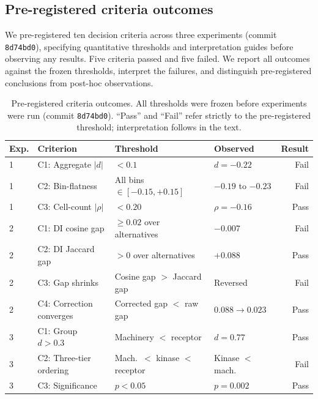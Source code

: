 
\subsection{Pre-registered criteria outcomes}

We pre-registered ten decision criteria across three experiments (commit \texttt{8d74bd0}), specifying quantitative thresholds and interpretation guides before observing any results.
Five criteria passed and five failed.
We report all outcomes against the frozen thresholds, interpret the failures, and distinguish pre-registered conclusions from post-hoc observations.

\begin{table}[htbp]
\centering
\caption{Pre-registered criteria outcomes. All thresholds were frozen before experiments were run (commit \texttt{8d74bd0}). ``Pass'' and ``Fail'' refer strictly to the pre-registered threshold; interpretation follows in the text.}
\label{tab:prereg_outcomes}
\small
\begin{tabular}{llllr}
\toprule
\textbf{Exp.} & \textbf{Criterion} & \textbf{Threshold} & \textbf{Observed} & \textbf{Result} \\
\midrule
1 & C1: Aggregate $|d|$ & $< 0.1$ & $d = -0.22$ & Fail \\
1 & C2: Bin-flatness & All bins $\in [-0.15, +0.15]$ & $-0.19$ to $-0.23$ & Fail \\
1 & C3: Cell-count $|\rho|$ & $< 0.20$ & $\rho = -0.16$ & Pass \\
\midrule
2 & C1: DI cosine gap & $\geq 0.02$ over alternatives & $-0.007$ & Fail \\
2 & C2: DI Jaccard gap & $> 0$ over alternatives & $+0.088$ & Pass \\
2 & C3: Gap shrinks & Cosine gap $>$ Jaccard gap & Reversed & Fail \\
2 & C4: Correction converges & Corrected gap $<$ raw gap & $0.088 \to 0.023$ & Pass \\
\midrule
3 & C1: Group $d > 0.3$ & Machinery $<$ receptor & $d = 0.77$ & Pass \\
3 & C2: Three-tier ordering & Mach.\ $<$ kinase $<$ receptor & Kinase $<$ mach. & Fail \\
3 & C3: Significance & $p < 0.05$ & $p = 0.002$ & Pass \\
\bottomrule
\end{tabular}
\end{table}

